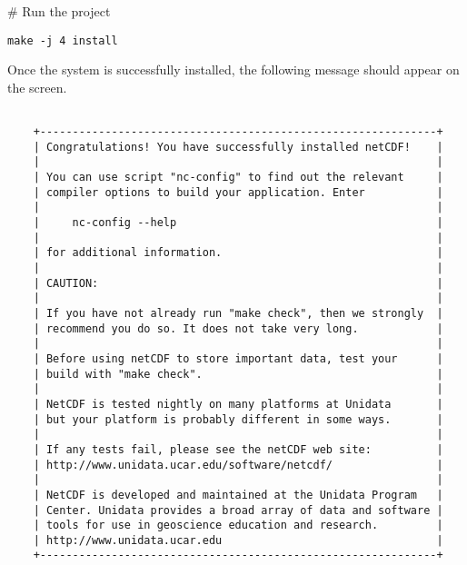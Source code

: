 \begin{framed}

\# Run the project

\texttt{make -j 4 install}

\end{framed}

Once the system is successfully installed, the following message should appear on the screen.

\begin{framed}

\begin{verbatim}

    +-------------------------------------------------------------+
    | Congratulations! You have successfully installed netCDF!    |
    |                                                             |
    | You can use script "nc-config" to find out the relevant     |
    | compiler options to build your application. Enter           |
    |                                                             |
    |     nc-config --help                                        |
    |                                                             |
    | for additional information.                                 |
    |                                                             |
    | CAUTION:                                                    |
    |                                                             |
    | If you have not already run "make check", then we strongly  |
    | recommend you do so. It does not take very long.            |
    |                                                             |
    | Before using netCDF to store important data, test your      |
    | build with "make check".                                    |
    |                                                             |
    | NetCDF is tested nightly on many platforms at Unidata       |
    | but your platform is probably different in some ways.       |
    |                                                             |
    | If any tests fail, please see the netCDF web site:          |
    | http://www.unidata.ucar.edu/software/netcdf/                |
    |                                                             |
    | NetCDF is developed and maintained at the Unidata Program   |
    | Center. Unidata provides a broad array of data and software |
    | tools for use in geoscience education and research.         |
    | http://www.unidata.ucar.edu                                 |
    +-------------------------------------------------------------+

\end{verbatim}

\end{framed}

